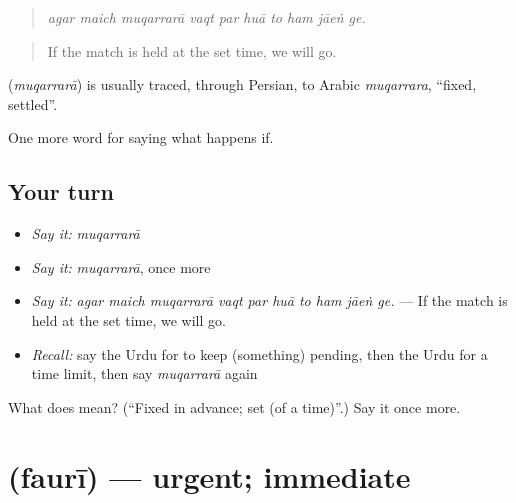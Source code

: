 \begin{quote}
         
\end{quote}

\begin{quote}
\emph{agar maich muqarrarā vaqt par huā to ham jāeṅ ge.}
\end{quote}

\begin{quote}
If the match is held at the set time, we will go.
\end{quote}

\begin{cousinweb}
\textbf{} (\emph{muqarrarā}) is usually traced, through Persian, to Arabic \emph{muqarrara}, \textquotedblleft{}fixed, settled\textquotedblright{}.
\end{cousinweb}

\begin{grammarlens}[title={What you've built}]
One more word for saying what happens if.
\end{grammarlens}

\subsection*{Your turn}
\begin{itemize}
\raggedright
  \item \emph{Say it:} \emph{muqarrarā}
  \item \emph{Say it:} \emph{muqarrarā}, once more
  \item \emph{Say it:} \emph{agar maich muqarrarā vaqt par huā to ham jāeṅ ge.} — If the match is held at the set time, we will go.
  \item \emph{Recall:} say the Urdu for to keep (something) pending, then the Urdu for a time limit, then say \emph{muqarrarā} again
\end{itemize}

\begin{tcolorbox}[breakable,colback=teal!4,colframe=teal!35!black,title={Before you move on}]
What does  mean? (\textquotedblleft{}Fixed in advance; set (of a time)\textquotedblright{}.) Say it once more.
\end{tcolorbox}
\section[\texorpdfstring{\ur{فوری} (faurī)}{فوری (faurī)}]{ (faurī) — urgent; immediate}

